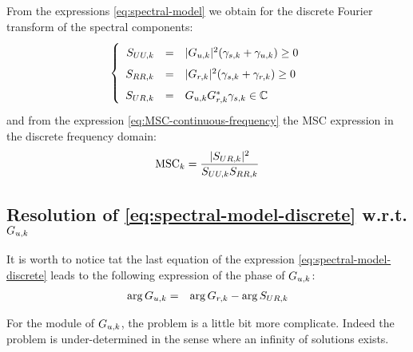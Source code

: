 From the expressions \eqref{eq:spectral-model} we obtain for the discrete Fourier transform of the spectral components:
\begin{eqnarray}
\label{eq:spectral-model-discrete}
\left\{
\renewcommand\arraystretch{1.6}
\begin{array}{rcl}
S_{UU,k}&=&|G_{\ut,k}|^{2} (\gamma_{s,k}+\gamma_{\ut,k})\geq 0
\\
S_{RR,k}&=&|G_{\rf,k}|^{2} (\gamma_{s,k}+\gamma_{\rf,k})\geq 0
\\
S_{UR,k}&=&G_{\ut,k}G^{*}_{\rf,k}\gamma_{s,k}\in\mathbb{C}
\end{array}
\right.
\end{eqnarray}
and from the expression \eqref{eq:MSC-continuous-frequency} the MSC expression in the discrete frequency domain:
\begin{eqnarray}
 \label{eq:exact-MSC}
\mathrm{MSC}_{k} = \frac{|{S_{UR,k}}|^{2}}{{S_{UU,k}}{S_{RR,k}}}
\end{eqnarray}








\subsection{Resolution of \eqref{eq:spectral-model-discrete} w.r.t. $G_{{u},k}$}

It is worth to notice tat the last equation of the expression \eqref{eq:spectral-model-discrete} leads to the following expression of the phase of $G_{{u},k}$:
\begin{eqnarray}
 \label{eq:phase-estimation}
 \arg G_{{u},k}&=& \arg G_{{r},k}- \arg S_{UR,k}
\end{eqnarray}

For the module of $G_{{u},k}$, the problem is a little bit more complicate. Indeed the problem is under-determined in the sense where an infinity of solutions exists. 

